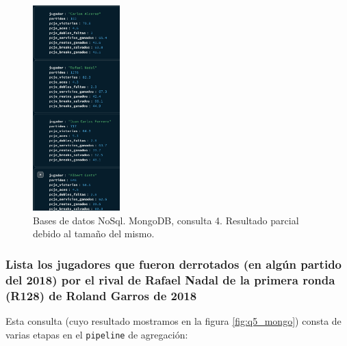 \begin{figure}[H]
\centering
\includegraphics[width=0.3\textwidth]{fotos/mongo/q4.png}
\caption{Bases de datos NoSql. MongoDB, consulta 4. Resultado parcial debido al tamaño del mismo.}
\label{fig:q4_mongo}
\end{figure}




\subsubsection{Lista los jugadores que fueron derrotados (en algún partido del 2018) por el rival de Rafael Nadal de la primera ronda (R128) de Roland Garros de 2018}

Esta consulta (cuyo resultado mostramos en la figura \ref{fig:q5_mongo}) consta de varias etapas en el \texttt{pipeline} de agregación:

